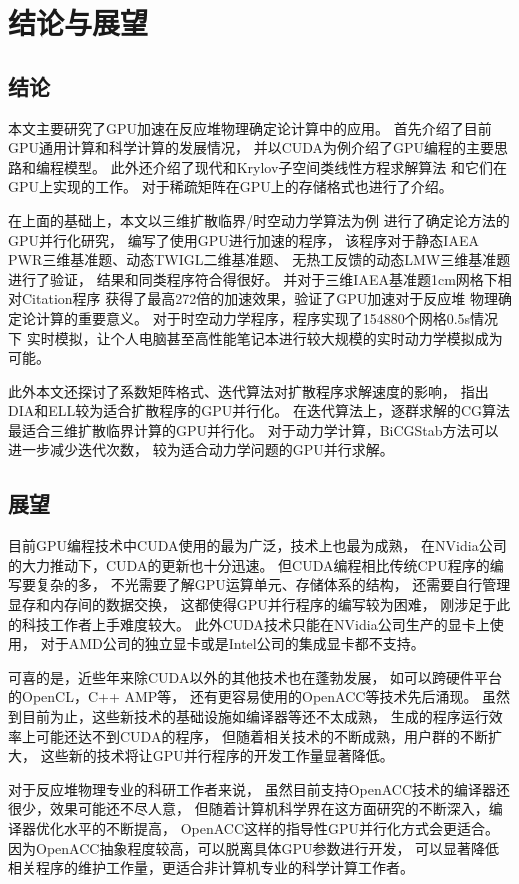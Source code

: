 
\chapter{结论与展望}

\section{结论}

本文主要研究了GPU加速在反应堆物理确定论计算中的应用。
首先介绍了目前GPU通用计算和科学计算的发展情况，
并以CUDA为例介绍了GPU编程的主要思路和编程模型。
此外还介绍了现代和Krylov子空间类线性方程求解算法
和它们在GPU上实现的工作。
对于稀疏矩阵在GPU上的存储格式也进行了介绍。

在上面的基础上，本文以三维扩散临界/时空动力学算法为例
进行了确定论方法的GPU并行化研究，
编写了使用GPU进行加速的\ProgramName 程序，
该程序对于静态IAEA PWR三维基准题、动态TWIGL二维基准题、
无热工反馈的动态LMW三维基准题进行了验证，
结果和同类程序符合得很好。
并对于三维IAEA基准题1cm网格下相对Citation程序
获得了最高272倍的加速效果，验证了GPU加速对于反应堆
物理确定论计算的重要意义。
对于时空动力学程序，\ProgramName 程序实现了154880个网格0.5s情况下
实时模拟，让个人电脑甚至高性能笔记本进行较大规模的实时动力学模拟成为可能。

此外本文还探讨了系数矩阵格式、迭代算法对扩散程序求解速度的影响，
指出DIA和ELL较为适合扩散程序的GPU并行化。
在迭代算法上，逐群求解的CG算法最适合三维扩散临界计算的GPU并行化。
对于动力学计算，BiCGStab方法可以进一步减少迭代次数，
较为适合动力学问题的GPU并行求解。

\section{展望}

目前GPU编程技术中CUDA使用的最为广泛，技术上也最为成熟，
在NVidia公司的大力推动下，CUDA的更新也十分迅速。
但CUDA编程相比传统CPU程序的编写要复杂的多，
不光需要了解GPU运算单元、存储体系的结构，
还需要自行管理显存和内存间的数据交换，
这都使得GPU并行程序的编写较为困难，
刚涉足于此的科技工作者上手难度较大。
此外CUDA技术只能在NVidia公司生产的显卡上使用，
对于AMD公司的独立显卡或是Intel公司的集成显卡都不支持。

可喜的是，近些年来除CUDA以外的其他技术也在蓬勃发展，
如可以跨硬件平台的OpenCL，C++ AMP等，
还有更容易使用的OpenACC等技术先后涌现。
虽然到目前为止，这些新技术的基础设施如编译器等还不太成熟，
生成的程序运行效率上可能还达不到CUDA的程序，
但随着相关技术的不断成熟，用户群的不断扩大，
这些新的技术将让GPU并行程序的开发工作量显著降低。

对于反应堆物理专业的科研工作者来说，
虽然目前支持OpenACC技术的编译器还很少，效果可能还不尽人意，
但随着计算机科学界在这方面研究的不断深入，编译器优化水平的不断提高，
OpenACC这样的指导性GPU并行化方式会更适合。
因为OpenACC抽象程度较高，可以脱离具体GPU参数进行开发，
可以显著降低相关程序的维护工作量，更适合非计算机专业的科学计算工作者。
